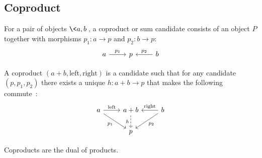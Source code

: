 \subsection{Coproduct}

\begin{definition}

	For a pair of objects $\<a, b\>$, a coproduct or sum candidate consists of an
	object $P$ together with morphisms $p_1: a\to p$ and
	$p_2:b\to p$:
	\[\begin{tikzcd}[ampersand replacement=\&]
		a \& p \& b
		\arrow["{p_1}", from=1-1, to=1-2]
		\arrow["{p_2}"', from=1-3, to=1-2]
	\end{tikzcd}\]

	A coproduct $(a + b, \mathrm{left}, \mathrm{right})$ is a candidate such that
	for any candidate $(p, p_1, p_2)$ there exists a unique $h: a+b\to p$ that
	makes the following
	commute~\parencite[p.~127]{leinster:basic_category_theory}:
	\[\begin{tikzcd}[ampersand replacement=\&]
		a \& {a+b} \& b \\
		\& p
		\arrow["{\mathrm{left}}", from=1-1, to=1-2]
		\arrow["{\mathrm{right}}"', from=1-3, to=1-2]
		\arrow["{p_1}"', from=1-1, to=2-2]
		\arrow["{p_2}", from=1-3, to=2-2]
		\arrow["h"', dashed, from=1-2, to=2-2]
	\end{tikzcd}\]
\end{definition}

\begin{remark}
	Coproducts are the dual of products.
\end{remark}

